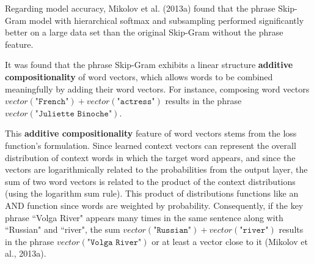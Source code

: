 Regarding model accuracy, Mikolov et al. (2013a) found that the phrase Skip-Gram model with hierarchical softmax and subsampling performed significantly better on a large data set than the original Skip-Gram without the phrase feature. 

It was found that the phrase Skip-Gram exhibits a linear structure \textbf{additive compositionality} of word vectors, which allows words to be combined meaningfully by adding their word vectors. For instance, composing word vectors $vector(\texttt{"French"}) + vector(\texttt{"actress"})$ results in the phrase $vector(\texttt{"Juliette Binoche"})$. 

This \textbf{additive compositionality} feature of word vectors stems from the loss function's formulation. Since learned context vectors can represent the overall distribution of context words in which the target word appears, and since the vectors are logarithmically related to the probabilities from the output layer, the sum of two word vectors is related to the product of the context distributions (using the logarithm sum rule). This product of distributions functions like an AND function since words are weighted by probability. Consequently, if the key phrase ``Volga River" appears many times in the same sentence along with ``Russian" and ``river", the sum $vector(\texttt{"Russian"}) + vector(\texttt{"river"})$ results in the phrase $vector(\texttt{"Volga River"})$ or at least a vector close to it (Mikolov et al., 2013a). 
